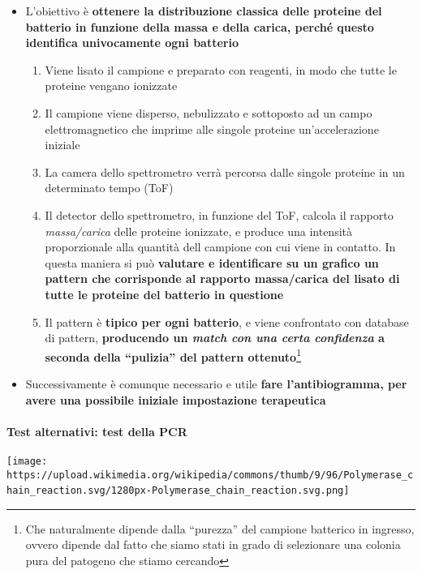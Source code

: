 \documentclass[italian,]{article}
\providecommand{\tightlist}{%
  \setlength{\itemsep}{0pt}\setlength{\parskip}{0pt}}
\begin{document}
\begin{itemize}
\tightlist
\item
  L'obiettivo è \textbf{ottenere la distribuzione classica delle
  proteine del batterio in funzione della massa e della carica, perché
  questo identifica univocamente ogni batterio}

  \begin{enumerate}
  \def\labelenumi{\arabic{enumi}.}
  \tightlist
  \item
    Viene lisato il campione e preparato con reagenti, in modo che tutte
    le proteine vengano ionizzate
  \item
    Il campione viene disperso, nebulizzato e sottoposto ad un campo
    elettromagnetico che imprime alle singole proteine un'accelerazione
    iniziale
  \item
    La camera dello spettrometro verrà percorsa dalle singole proteine
    in un determinato tempo (ToF)
  \item
    Il detector dello spettrometro, in funzione del ToF, calcola il
    rapporto \emph{massa/carica} delle proteine ionizzate, e produce una
    intensità proporzionale alla quantità dell campione con cui viene in
    contatto. In questa maniera si può \textbf{valutare e identificare
    su un grafico un pattern che corrisponde al rapporto massa/carica
    del lisato di tutte le proteine del batterio in questione}
  \item
    Il pattern è \textbf{tipico per ogni batterio}, e viene confrontato
    con database di pattern, \textbf{producendo un \emph{match con una
    certa confidenza} a seconda della ``pulizia'' del pattern
    ottenuto}\footnote{Che naturalmente dipende dalla ``purezza'' del
      campione batterico in ingresso, ovvero dipende dal fatto che siamo
      stati in grado di selezionare una colonia pura del patogeno che
      stiamo cercando}
  \end{enumerate}
\item
  Successivamente è comunque necessario e utile \textbf{fare
  l'antibiogramma, per avere una possibile iniziale impostazione
  terapeutica}
\end{itemize}

\hypertarget{test-alternativi-test-della-pcr}{%
\paragraph{Test alternativi: test della
PCR}\label{test-alternativi-test-della-pcr}}

\texttt{[image: https://upload.wikimedia.org/wikipedia/commons/thumb/9/96/Polymerase\_chain\_reaction.svg/1280px-Polymerase\_chain\_reaction.svg.png]}~
\end{document}

